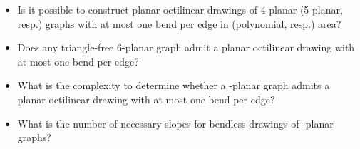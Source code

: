 \documentclass[a4paper,twoside,11pt]{article}
\begin{document}
\begin{itemize}
\item Is it possible to construct planar octilinear drawings of
4-planar (5-planar, resp.) graphs with at most one bend per edge in
 (polynomial, resp.) area?
\item Does any triangle-free 6-planar graph admit a planar
octilinear drawing with at most one bend per edge?
\item What is the complexity to determine whether a -planar graph
admits a planar octilinear drawing with at most one bend per edge?
\item What is the number of necessary slopes for bendless drawings
of -planar graphs?
\end{itemize}



\end{document}
